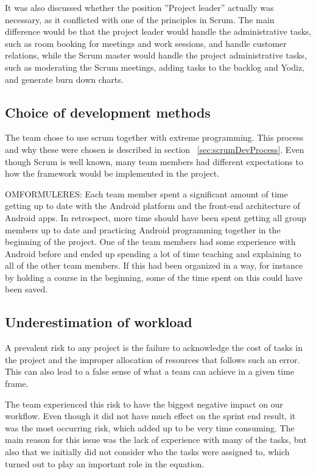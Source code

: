 It was also discussed whether the position ''Project leader'' actually was necessary, as it conflicted with one of the principles in Scrum.  The main difference would be that the project leader would handle the administrative tasks, such as room booking for meetings and work sessions, and handle customer relations, while the Scrum master would handle the project administrative tasks, such as moderating the Scrum meetings, adding tasks to the backlog and Yodiz, and generate burn down charts.

\subsection{Choice of development methods}

The team chose to use scrum together with extreme programming. This process and why these were chosen is described in section ~\ref{sec:scrumDevProcess}. Even though Scrum is well known, many team members had different expectations to how the framework would be implemented in the project.


OMFORMULERES: Each team member spent a significant amount of time getting up to date with the Android platform and the front-end architecture of Android apps. In retrospect, more time should have been spent getting all group members up to date and practicing Android programming together in the beginning of the project. One of the team members had some experience with Android before and ended up spending a lot of time teaching and explaining to all of the other team members. If this had been organized in a way, for instance by holding a course in the beginning, some of the time spent on this could have been saved. 

\subsection{Underestimation of workload}
A prevalent risk to any project is the failure to acknowledge the cost of tasks in the project and the improper allocation of resources that follows such an error. This can also lead to a false sense of what a team can achieve in a given time frame. 

The team experienced this risk to have the biggest negative impact on our workflow. Even though it did not have much effect on the sprint end result, it was the most occurring risk, which added up to be very time consuming. The main reason for this issue was the lack of experience with many of the tasks, but also that we initially did not consider who the tasks were assigned to, which turned out to play an important role in the equation. 

